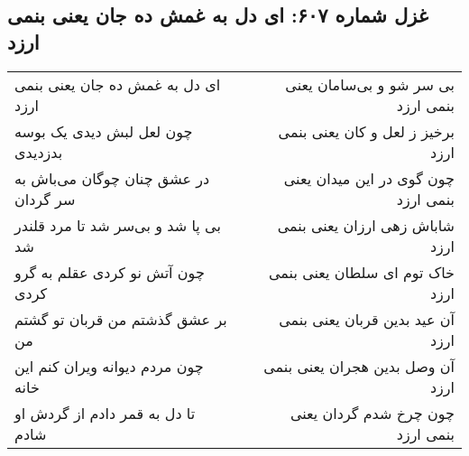 \begin{center}
\section*{غزل شماره ۶۰۷: ای دل به غمش ده جان یعنی بنمی ارزد}
\label{sec:0607}
\begin{longtable}{l p{0.5cm} r}
ای دل به غمش ده جان یعنی بنمی ارزد
&&
بی سر شو و بی‌سامان یعنی بنمی ارزد
\\
چون لعل لبش دیدی یک بوسه بدزدیدی
&&
برخیز ز لعل و کان یعنی بنمی ارزد
\\
در عشق چنان چوگان می‌باش به سر گردان
&&
چون گوی در این میدان یعنی بنمی ارزد
\\
بی پا شد و بی‌سر شد تا مرد قلندر شد
&&
شاباش زهی ارزان یعنی بنمی ارزد
\\
چون آتش نو کردی عقلم به گرو کردی
&&
خاک توم ای سلطان یعنی بنمی ارزد
\\
بر عشق گذشتم من قربان تو گشتم من
&&
آن عید بدین قربان یعنی بنمی ارزد
\\
چون مردم دیوانه ویران کنم این خانه
&&
آن وصل بدین هجران یعنی بنمی ارزد
\\
تا دل به قمر دادم از گردش او شادم
&&
چون چرخ شدم گردان یعنی بنمی ارزد
\\
\end{longtable}
\end{center}
